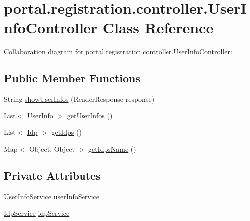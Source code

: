 \hypertarget{classportal_1_1registration_1_1controller_1_1UserInfoController}{
\section{portal.registration.controller.UserInfoController Class Reference}
\label{classportal_1_1registration_1_1controller_1_1UserInfoController}
}


Collaboration diagram for portal.registration.controller.UserInfoController:
\subsection*{Public Member Functions}
\begin{DoxyCompactItemize}
\item 
String \hyperlink{classportal_1_1registration_1_1controller_1_1UserInfoController_a6e2c26b56d5b19cdf53dc1fc21340fed}{showUserInfos} (RenderResponse response)
\item 
List$<$ \hyperlink{classportal_1_1registration_1_1domain_1_1UserInfo}{UserInfo} $>$ \hyperlink{classportal_1_1registration_1_1controller_1_1UserInfoController_a18a0895286727db4f137c8388032436c}{getUserInfos} ()
\item 
List$<$ \hyperlink{classportal_1_1registration_1_1domain_1_1Idp}{Idp} $>$ \hyperlink{classportal_1_1registration_1_1controller_1_1UserInfoController_adaa936d75f430ec7491d04ba2ab1c801}{getIdps} ()
\item 
Map$<$ Object, Object $>$ \hyperlink{classportal_1_1registration_1_1controller_1_1UserInfoController_a729989822e30433e3f24b3163254a61f}{getIdpsName} ()
\end{DoxyCompactItemize}
\subsection*{Private Attributes}
\begin{DoxyCompactItemize}
\item 
\hyperlink{interfaceportal_1_1registration_1_1services_1_1UserInfoService}{UserInfoService} \hyperlink{classportal_1_1registration_1_1controller_1_1UserInfoController_ac06a557486646e8c2fd7a75ad935b6d3}{userInfoService}
\item 
\hyperlink{interfaceportal_1_1registration_1_1services_1_1IdpService}{IdpService} \hyperlink{classportal_1_1registration_1_1controller_1_1UserInfoController_a6624c6a71628b8393fd31acfed28cf16}{idpService}
\end{DoxyCompactItemize}


